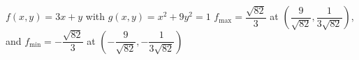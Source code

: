 {$f(x,y) = 3x+y$ with $g(x,y) = x^2 + 9y^2 = 1$
}
{$f_{\text{max}} = \dfrac{\sqrt{82}}{3}$ at $\left( \dfrac{9}{\sqrt{82}}, \dfrac{1}{3\sqrt{82}} \right)$, and $f_{\text{min}} = -\dfrac{\sqrt{82}}{3}$ at $\left( -\dfrac{9}{\sqrt{82}}, -\dfrac{1}{3\sqrt{82}} \right)$}